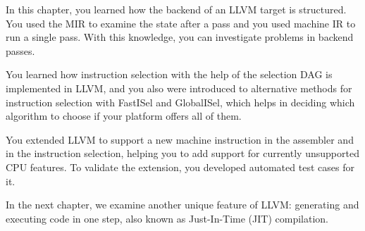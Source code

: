In this chapter, you learned how the backend of an LLVM target is structured. You used the MIR to examine the state after a pass and you used machine IR to run a single pass. With this knowledge, you can investigate problems in backend passes.\par

You learned how instruction selection with the help of the selection DAG is implemented in LLVM, and you also were introduced to alternative methods for instruction selection with FastISel and GlobalISel, which helps in deciding which algorithm to choose if your platform offers all of them.\par

You extended LLVM to support a new machine instruction in the assembler and in the instruction selection, helping you to add support for currently unsupported CPU features. To validate the extension, you developed automated test cases for it.\par

In the next chapter, we examine another unique feature of LLVM: generating and executing code in one step, also known as Just-In-Time (JIT) compilation.\par

\newpage